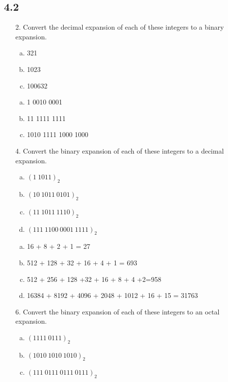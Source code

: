 \subsection{4.2}
\begin{itemize}
    \item[2.] Convert the decimal expansion of each of these integers to a binary expansion.
          \begin{enumerate}[a.]
              \item 321
              \item 1023
              \item 100632
          \end{enumerate}
          \answer
          \begin{enumerate}[a.]
              \item 1 0010 0001
              \item 11 1111 1111
              \item 1010 1111 1000 1000
          \end{enumerate}
    \item[4.] Convert the binary expansion of each of these integers to a decimal expansion.
          \begin{enumerate}[a.]
              \item $(1\ 1011)_2$
              \item $(10\ 1011\ 0101)_2$
              \item $(11\ 1011\ 1110)_2$
              \item $(111\ 1100\ 0001\ 1111)_2$
          \end{enumerate}
          \answer
          \begin{enumerate}[a.]
              \item 16 + 8 + 2 + 1 = 27
              \item 512 + 128 + 32 + 16 + 4 + 1 = 693
              \item 512 + 256 + 128 +32 + 16 + 8 + 4 +2=958
              \item 16384 + 8192 + 4096 + 2048 + 1012 + 16 + 15 = 31763
          \end{enumerate}
    \item[6.] Convert the binary expansion of each of these integers to an octal expansion.
          \begin{enumerate}[a.]
              \item $(1111\ 0111)_2$
              \item $(1010\ 1010\ 1010)_2$
              \item $(111\ 0111\ 0111\ 0111)_2$

\end{enumerate}
\end{itemize}
